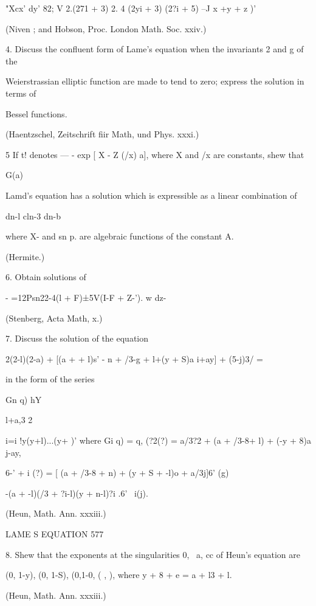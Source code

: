 {{{{{{{{"Xcx' dy' 82; V 2.(271 + 3)  2. 4 (2yi + 3) (2?i + 5) --J   x +y  + z )' 

(Niven ; and Hobson, Proc. London Math. Soc. xxiv.) 

4. Discuss the confluent form of Lame's equation when the invariants  2 and g  of the 

Weierstrassian elliptic function are made to tend to zero; express the solution in terms of 

Bessel functions. 

(Haentzschel, Zeitschrift fiir Math, und Phys. xxxi.) 

5 If t! denotes —   - exp [ X - Z (/x)  a], where X and /x are constants, shew that 

G(a) 

Lamd's equation has a solution which is expressible as a linear combination of 

dn-l  cln-3  dn-b  

where X- and sn  p. are algebraic functions of the constant A. 

(Hermite.) 

6. Obtain solutions of 

- =12Psn22-4(l + F)±5V(I-F + Z-'). 
w dz- 

(Stenberg, Acta Math, x.) 

7. Discuss the solution of the equation 

2(2-l)(2-a)  + [(a +   + l)s' - n + /3-g + l+(y + S)a i+ay]  +   (5-j)3/ = 

in the form of the series 

Gn q)  hY 



l+a,3 2 



i=i !y(y+l)...(y+ )' 
where Gi q) = q, (?2(?) = a/3?2 +  (a + /3-8+ l) + (-y + 8)a  j-ay, 

6-'  + i (?) = [   (a + /3-8 + n) + (y + S +  -l)o  + a/3j]6' (g) 

-(a +  -l)(/3 + ?i-l)(y + n-l)?i .6' \ i(j). 

(Heun, Math. Ann. xxxiii.) 



LAME S EQUATION 577 

8. Shew that the exponents at the singularities 0, \, a, cc of Heun's equation are 

(0, 1-y), (0, 1-S), (0,1-0, ( , ), 
where y + 8 + e = a + l3 + l. 

(Heun, Math. Ann. xxxiii.) 

}}}}}}}}
